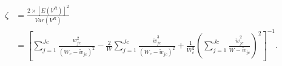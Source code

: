 \begin{equation}
    \begin{split}
        \zeta & = \frac{2 \times [E(V^R)]^2}{Var(V^R)} \\
             & = \left[ \sum_{j = 1} ^{Jc} \frac{w^2_{jc}}{ (W_c - \tilde{w}_{jc}) ^2} - \frac{2}{W} \sum_{j = 1} ^{Jc} \frac{\tilde{w}_{jc}^3}{(W_c - \tilde{w}_{jc})^2} + \frac{1}{W_c^2} \left(\sum_{j = 1} ^{Jc} \frac{\tilde{w}_{jc}^2}{W-\tilde{w}_{jc}} \right)^2 \right]^{-1}.
    \end{split}
    \nonumber
\end{equation}





